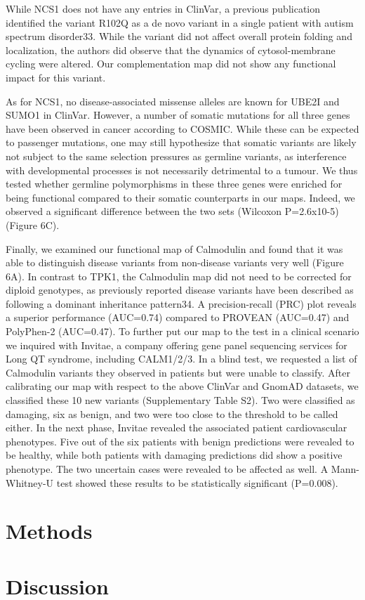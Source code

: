 While NCS1 does not have any entries in ClinVar, a previous publication identified the variant R102Q as a de novo variant in a single patient with autism spectrum disorder33. While the variant did not affect overall protein folding and localization, the authors did observe that the dynamics of cytosol-membrane cycling were altered. Our complementation map did not show any functional impact for this variant.

As for NCS1, no disease-associated missense alleles are known for UBE2I and SUMO1 in ClinVar. However, a number of somatic mutations for all three genes have been observed in cancer according to COSMIC. While these can be expected to passenger mutations, one may still hypothesize that somatic variants are likely not subject to the same selection pressures as germline variants, as interference with developmental processes is not necessarily detrimental to a tumour. We thus tested whether germline polymorphisms in these three genes were enriched for being functional compared to their somatic counterparts in our maps. Indeed, we observed a significant difference between the two sets (Wilcoxon P=2.6x10-5) (Figure 6C).

Finally, we examined our functional map of Calmodulin and found that it was able to distinguish disease variants from non-disease variants very well (Figure 6A). In contrast to TPK1, the Calmodulin map did not need to be corrected for diploid genotypes, as previously reported disease variants have been described as following a dominant inheritance pattern34. A precision-recall (PRC) plot reveals a superior performance (AUC=0.74) compared to PROVEAN (AUC=0.47) and PolyPhen-2 (AUC=0.47).  To further put our map to the test in a clinical scenario we inquired with Invitae, a company offering gene panel sequencing services for Long QT syndrome, including CALM1/2/3. In a blind test, we requested a list of Calmodulin variants they observed in patients but were unable to classify. After calibrating our map with respect to the above ClinVar and GnomAD datasets, we classified these 10 new variants (Supplementary Table S2). Two were classified as damaging, six as benign, and two were too close to the threshold to be called either. In the next phase, Invitae revealed the associated patient cardiovascular phenotypes. Five out of the six patients with benign predictions were revealed to be healthy, while both patients with damaging predictions did show a positive phenotype. The two uncertain cases were revealed to be affected as well. A Mann-Whitney-U test showed these results to be statistically significant (P=0.008).


\section{Methods}

\section{Discussion}

